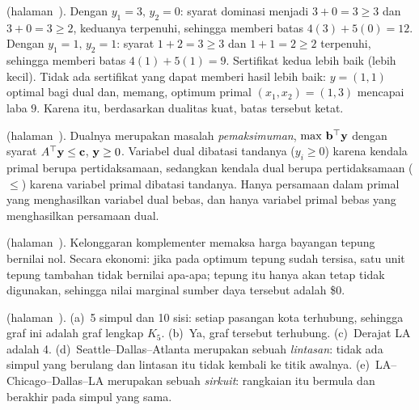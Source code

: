 \medskip

\noindent\textbf{} (halaman~\pageref{lc:duality-certificate}).
Dengan $y_1 = 3,\, y_2 = 0$: syarat dominasi menjadi $3 + 0 = 3 \geq 3$ dan $3 + 0 = 3 \geq 2$, keduanya terpenuhi, sehingga memberi batas $4(3) + 5(0) = 12$. Dengan $y_1 = 1,\, y_2 = 1$: syarat $1 + 2 = 3 \geq 3$ dan $1 + 1 = 2 \geq 2$ terpenuhi, sehingga memberi batas $4(1) + 5(1) = 9$. Sertifikat kedua lebih baik (lebih kecil). Tidak ada sertifikat yang dapat memberi hasil lebih baik: $y = (1,1)$ optimal bagi dual dan, memang, optimum primal $(x_1, x_2) = (1,3)$ mencapai laba $9$. Karena itu, berdasarkan dualitas kuat, batas tersebut ketat.

\medskip

\noindent\textbf{} (halaman~\pageref{lc:dual-forms}).
Dualnya merupakan masalah \emph{pemaksimuman}, $\max\, \mathbf{b}^\top \mathbf{y}$ dengan syarat $A^\top \mathbf{y} \leq \mathbf{c}$, $\mathbf{y} \geq 0$. Variabel dual dibatasi tandanya ($y_i \geq 0$) karena kendala primal berupa pertidaksamaan, sedangkan kendala dual berupa pertidaksamaan ($\leq$) karena variabel primal dibatasi tandanya. Hanya persamaan dalam primal yang menghasilkan variabel dual bebas, dan hanya variabel primal bebas yang menghasilkan persamaan dual.

\medskip

\noindent\textbf{} (halaman~\pageref{lc:cs-leftover}).
Kelonggaran komplementer memaksa harga bayangan tepung bernilai nol. Secara ekonomi: jika pada optimum tepung sudah tersisa, satu unit tepung tambahan tidak bernilai apa-apa; tepung itu hanya akan tetap tidak digunakan, sehingga nilai marginal sumber daya tersebut adalah \$0.

\medskip

\noindent\textbf{} (halaman~\pageref{lc:graph-5cities}).
(a)~5 simpul dan 10 sisi: setiap pasangan kota terhubung, sehingga graf ini adalah graf lengkap $K_5$.
(b)~Ya, graf tersebut terhubung.
(c)~Derajat LA adalah 4.
(d)~Seattle--Dallas--Atlanta merupakan sebuah \emph{lintasan}: tidak ada simpul yang berulang dan lintasan itu tidak kembali ke titik awalnya.
(e)~LA--Chicago--Dallas--LA merupakan sebuah \emph{sirkuit}: rangkaian itu bermula dan berakhir pada simpul yang sama.
